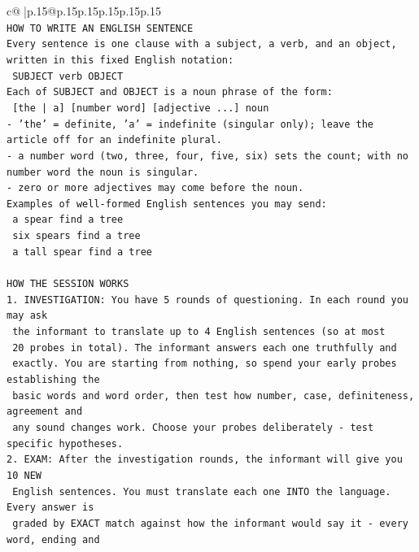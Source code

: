 \documentclass{article}
\begin{document}
{\begin{supertabular}{c@{$\;$}|p{.15\linewidth}@{}p{.15\linewidth}p{.15\linewidth}p{.15\linewidth}p{.15\linewidth}p{.15\linewidth}}
{{{\\ 
\texttt{HOW TO WRITE AN ENGLISH SENTENCE} \\
\texttt{Every sentence is one clause with a subject, a verb, and an object, written in this fixed English notation:} \\
\texttt{    SUBJECT  verb  OBJECT} \\
\texttt{Each of SUBJECT and OBJECT is a noun phrase of the form:} \\
\texttt{    {[}the | a{]}  {[}number word{]}  {[}adjective ...{]}  noun} \\
\texttt{{-} 'the' = definite, 'a' = indefinite (singular only); leave the article off for an indefinite plural.} \\
\texttt{{-} a number word (two, three, four, five, six) sets the count; with no number word the noun is singular.} \\
\texttt{{-} zero or more adjectives may come before the noun.} \\
\texttt{Examples of well{-}formed English sentences you may send:} \\
\texttt{    a spear find a tree} \\
\texttt{    six spears find a tree} \\
\texttt{    a tall spear find a tree} \\
\\ 
\texttt{HOW THE SESSION WORKS} \\
\texttt{1. INVESTIGATION: You have 5 rounds of questioning. In each round you may ask} \\
\texttt{   the informant to translate up to 4 English sentences (so at most} \\
\texttt{   20 probes in total). The informant answers each one truthfully and} \\
\texttt{   exactly. You are starting from nothing, so spend your early probes establishing the} \\
\texttt{   basic words and word order, then test how number, case, definiteness, agreement and} \\
\texttt{   any sound changes work. Choose your probes deliberately {-} test specific hypotheses.} \\
\texttt{2. EXAM: After the investigation rounds, the informant will give you 10 NEW} \\
\texttt{   English sentences. You must translate each one INTO the language. Every answer is} \\
\texttt{   graded by EXACT match against how the informant would say it {-} every word, ending and} \\
}}}
\end{supertabular}}
\end{document}

